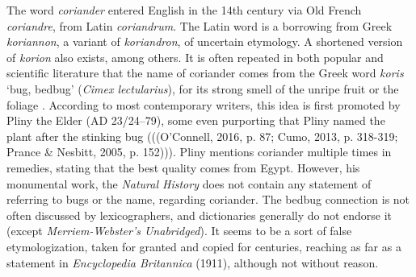 The word \textit{coriander} entered English in the 14th century via Old French \textit{coriandre}, from Latin \textit{coriandrum}. The Latin word is a borrowing from Greek \textit{koriannon}, a variant of \textit{koriandron}, of uncertain etymology. A shortened version of \textit{korion} also exists, among others. It is often repeated in both popular and scientific literature that the name of coriander comes from the Greek word \textit{koris} `bug, bedbug' (\textit{Cimex lectularius}), for its strong smell of the unripe fruit or the foliage \autocite[cf.][]{harper_coriander_nodate}. According to most contemporary writers, this idea is first promoted by Pliny the Elder (AD 23/24–79), some even purporting that Pliny named the plant after the stinking bug \autocite{oconnell_book_2016, cumo_encyclopedia_2013, prance_cultural_2005} (((O’Connell, 2016, p. 87; Cumo, 2013, p. 318-319; Prance \& Nesbitt, 2005, p. 152))). Pliny mentions coriander multiple times in remedies, stating that the best quality comes from Egypt. However, his monumental work, the \textit{Natural History} \autocite{pliny_the_elder_natural_1855} does not contain any statement of referring to bugs or the name, regarding coriander. The bedbug connection is not often discussed by lexicographers, and dictionaries generally do not endorse it (except \textit{Merriem-Webster's Unabridged}). It seems to be a sort of false etymologization, taken for granted and copied for centuries, reaching as far as a statement in \textit{Encyclopedia Britannica} (1911), although not without reason.

